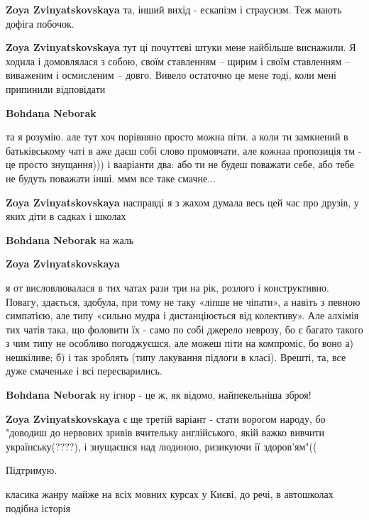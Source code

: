 \begin{itemize}
\begin{itemize}
\textbf{Zoya Zvinyatskovskaya} та, інший вихід - ескапізм і страусизм. Теж мають дофіга побочок.

\textbf{Zoya Zvinyatskovskaya} тут ці почуттєві штуки мене найбільше виснажили. Я ходила і домовлялася з собою, своїм ставленням – щирим і своїм ставленням – виваженим і осмисленим – довго. Вивело остаточно це мене тоді, коли мені припинили відповідати


\textbf{Bohdana Neborak} 

та я розумію. але тут хоч порівняно просто можна піти. а коли ти замкнений в
батьківському чаті в аже даєш собі слово промовчати, але кожнаа пропозиція тм -
це просто знущання))) і вааріанти два: або ти не будеш поважати себе, або тебе
не будуть поважати інші. ммм все таке смачне...

\textbf{Zoya Zvinyatskovskaya} насправді я з жахом думала весь цей час про друзів, у яких діти в садках і школах


\textbf{Bohdana Neborak} на жаль

\textbf{Zoya Zvinyatskovskaya} 

я от висловлювалася в тих чатах рази три на рік, розлого і конструктивно.
Повагу, здається, здобула, при тому не таку «ліпше не чіпати», а навіть з
певною симпатією, але типу «сильно мудра і дистанціюється від колективу». Але
алхімія тих чатів така, що фоловити їх - само по собі джерело неврозу, бо є
багато такого з чим типу не особливо погоджуєшся, але можеш піти на компроміс,
бо воно а) нешкіливе; б) і так зроблять (типу лакування підлоги в класі).
Врешті, та, все дуже смаченьке і всі пересварились.


\textbf{Bohdana Neborak} ну ігнор - це ж, як відомо, найпекельніша зброя!

\textbf{Zoya Zvinyatskovskaya} є ще третій варіант - стати ворогом народу, бо "доводиш до нервових зривів вчительку англійського, якій важко вивчити українську(????), і знущаєшся над людиною, ризикуючи її здоров'ям"((

\end{itemize} %

Підтримую.

класика жанру майже на всіх мовних курсах у Києві, до речі, в автошколах подібна історія


\end{itemize}
